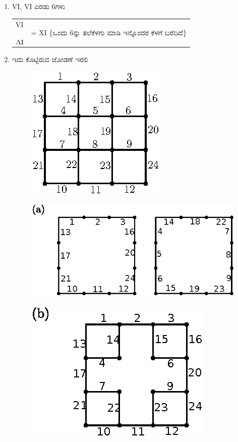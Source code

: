 \begin{enumerate}
\eject

\item VI, VI ಎರಡು 6ಗಳು 

\begin{tabular}[t]{ll}
VI & \multirow{2}{*}{= {\rm XI} \{ಒಂದು 6ನ್ನು ತಲೆಕೆಳಗು ಮಾಡಿ ಇನ್ನೊಂದರ ಕೆಳಗೆ ಬರೆದಿದೆ\}}\\[-7pt]	
${\rotatebox{180}{IV}}$ &\\
\end{tabular}

\item ಇದು ಕೊಟ್ಟಿರುವ ಜೋಡಣೆ ಇರಲಿ 
\begin{figure}[H]
\centering
\includegraphics[scale=1.2]{images/chap8/ans13.eps}
\end{figure}


\begin{figure}[H]
\centering
\includegraphics[scale=1.1]{images/chap8/ans13a.eps}
\end{figure}

\begin{minipage}[c]{4.5cm}
\begin{figure}[H]
\centering
\includegraphics{images/chap8/ans13b.eps}


\end{figure}
\end{minipage}
\end{enumerate}
